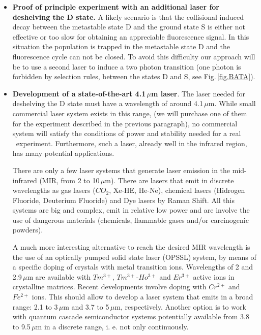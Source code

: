 \begin{itemize}
%	
	\item \textbf{Proof of principle experiment with an additional laser for deshelving the D state.}
A likely scenario is that the collisional induced decay between the metastable state D and the ground state S is either not effective or too slow for obtaining an appreciable fluorescence signal. In this situation the population is trapped in the metastable state D  and the fluorescence cycle can not be closed. To avoid this difficulty our approach will be to use a second laser to induce a two photon transition (one photon is forbidden by selection rules, between the states D and S, see Fig.\,\ref{fig.BATA}). 

\item \textbf{Development of a state-of-the-art 4.1\,$\mu$m laser}. The laser needed for
deshelving the D state must have a wavelength of around 4.1\,$\mu$m. While small commercial laser system exists in this range, (we will purchase one of them for the experiment described in the previous paragraph), no commercial system will satisfy the conditions of power and stability needed for a real \BATA\ experiment. Furthermore, such a laser, already well in the infrared region, has many potential applications.	

There are only a few laser systems that generate laser emission in the mid-infrared (MIR, from 2 to 10\,$\mu$m). There are lasers that emit in discrete wavelengths as gas lasers ($CO_2$, Xe-HE, He-Ne), chemical lasers (Hidrogen Fluoride, Deuterium Fluoride) and Dye lasers by Raman Shift. All this systems are big and complex, emit in relative low power and are involve the use of dangerous materials (chemicals, flammable gases and/or carcinogenic powders). 

A much more interesting alternative to reach the desired MIR wavelength is the use of an optically pumped solid state laser (OPSSL) system, by means of a specific doping of crystals with metal transition ions. Wavelengths of 2 and 2.9\,$\mu$m are available with $Tm^{3+}$, $Tm^{3+}$-$Ho^{3+}$ and $Er^{3+}$ active ions in crystalline matrices. Recent developments involve doping with $Cr^{2+}$ and $Fe^{2+}$ ions. This should allow to develop a laser system that emits in a broad range: 2.1 to 3\,$\mu$m and 3.7 to 5\,$\mu$m, respectively. Another option is to work with quantum cascade semiconductor systems potentially available from 3.8 to 9.5\,$\mu$m in a discrete range, i. e.  not only continuously. 


\end{itemize}
